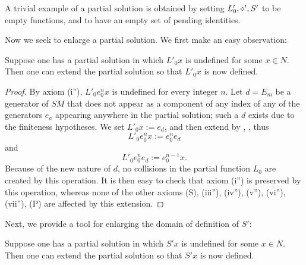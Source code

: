 A trivial example of a partial solution is obtained by setting $L'_0, \diamond', S'$ to be empty functions, and to have an empty set of pending identities.

Now we seek to enlarge a partial solution. We first make an easy observation:

\begin{proposition}[Enlarging $L'_0$]\label{enlarge-l0}  Suppose one has a partial solution in which $L'_0 x$ is undefined for some $x \in N$.  Then one can extend the partial solution so that $L'_0 x$ is now defined.
\end{proposition}

\begin{proof}  By axiom (i''), $L'_0 e_0^n x$ is undefined for every integer $n$.  Let $d = E_m$ be a generator of $SM$ that does not appear as a component of any index of any of the generators $e_a$ appearing anywhere in the partial solution; such a $d$ exists due to the finiteness hypotheses.  We set $L'_0 x := e_d$, and then extend by , , thus
$$L'_0 e_0^n x := e_0^n e_d$$
and
$$L'_0 e_0^n e_d := e_0^{n-1} x.$$
Because of the new nature of $d$, no collisions in the partial function $L_0$ are created by this operation.  It is then easy to check that axiom (i'') is preserved by this operation, whereas none of the other axioms (S), (iii''), (iv''), (v''), (vi''), (vii''), (P) are affected by this extension.
\end{proof}

Next, we provide a tool for enlarging the domain of definition of $S'$:

\begin{proposition}[Enlarging $S'$]\label{enlarge-S}  Suppose one has a partial solution in which $S'x$ is undefined for some $x \in N$.  Then one can extend the partial solution so that $S'x$ is now defined.
\end{proposition}

